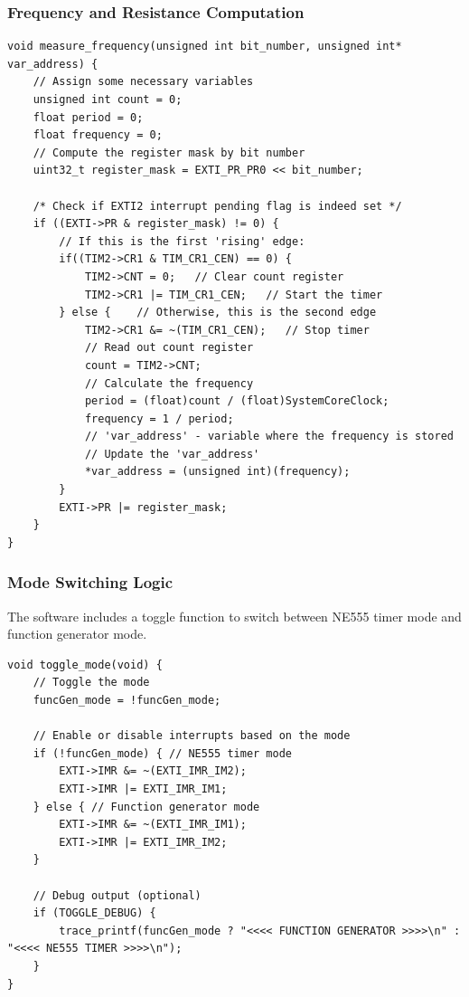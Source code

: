 \subsubsection{Frequency and Resistance Computation}
\begin{lstlisting}[caption=Frequency and Resistance Computation]
void measure_frequency(unsigned int bit_number, unsigned int* var_address) {
    // Assign some necessary variables
    unsigned int count = 0;
    float period = 0;
    float frequency = 0;
    // Compute the register mask by bit number
    uint32_t register_mask = EXTI_PR_PR0 << bit_number;

    /* Check if EXTI2 interrupt pending flag is indeed set */
    if ((EXTI->PR & register_mask) != 0) {
        // If this is the first 'rising' edge:
        if((TIM2->CR1 & TIM_CR1_CEN) == 0) {
            TIM2->CNT = 0;   // Clear count register
            TIM2->CR1 |= TIM_CR1_CEN;   // Start the timer
        } else {    // Otherwise, this is the second edge
            TIM2->CR1 &= ~(TIM_CR1_CEN);   // Stop timer
            // Read out count register 
            count = TIM2->CNT;
            // Calculate the frequency
            period = (float)count / (float)SystemCoreClock;
            frequency = 1 / period;
            // 'var_address' - variable where the frequency is stored
            // Update the 'var_address'
            *var_address = (unsigned int)(frequency);
        }
        EXTI->PR |= register_mask;
    }
}
\end{lstlisting}

\subsubsection{Mode Switching Logic}
The software includes a toggle function to switch between NE555 timer mode and function generator mode.

\begin{lstlisting}[caption=Toggle Mode Function]
void toggle_mode(void) {
    // Toggle the mode
    funcGen_mode = !funcGen_mode;

    // Enable or disable interrupts based on the mode
    if (!funcGen_mode) { // NE555 timer mode
        EXTI->IMR &= ~(EXTI_IMR_IM2);
        EXTI->IMR |= EXTI_IMR_IM1;
    } else { // Function generator mode
        EXTI->IMR &= ~(EXTI_IMR_IM1);
        EXTI->IMR |= EXTI_IMR_IM2;
    }

    // Debug output (optional)
    if (TOGGLE_DEBUG) {
        trace_printf(funcGen_mode ? "<<<< FUNCTION GENERATOR >>>>\n" : "<<<< NE555 TIMER >>>>\n");
    }
}
\end{lstlisting}

